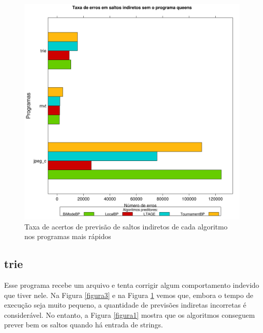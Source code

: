 \documentclass[12pt]{article}
\begin{document}
\begin{figure}[!htbp]
	
	\centering
	\includegraphics[scale=0.25]{Taxa_Miss_No_Queens.png}
	\caption{Taxa de acertos de previsão de saltos indiretos de cada algoritmo nos programas mais rápidos}
	\label{figura4}
	
\end{figure}

\subsection{trie}

Esse programa recebe um arquivo e tenta corrigir algum comportamento indevido que tiver nele. Na Figura \ref{figura3} e na Figura \ref{figura4} vemos que, embora o tempo de execução seja muito pequeno, a quantidade de previsões indiretas incorretas é considerável. No entanto, a Figura \ref{figura1} mostra que os algoritmos conseguem prever bem os saltos quando há entrada de strings.
\end{document}
